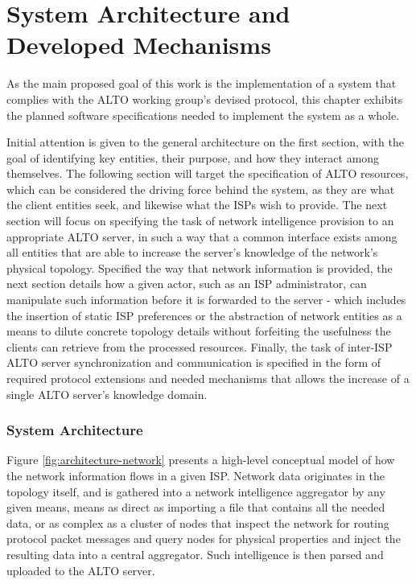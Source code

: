 \chapter{System Architecture and Developed Mechanisms}

As the main proposed goal of this work is the implementation of a system that complies with the ALTO working group's devised protocol, this chapter exhibits the planned software specifications needed to implement the system as a whole.

Initial attention is given to the general architecture on the first section, with the goal of identifying key entities, their purpose, and how they interact among themselves. The following section will target the specification of ALTO resources, which can be considered the driving force behind the system, as they are what the client entities seek, and likewise what the ISPs wish to provide. The next section will focus on specifying the task of network intelligence provision to an appropriate ALTO server, in such a way that a common interface exists among all entities that are able to increase the server's knowledge of the network's physical topology. Specified the way that network information is provided, the next section details how a given actor, such as an ISP administrator, can manipulate such information before it is forwarded to the server - which includes the insertion of static ISP preferences or the abstraction of network entities as a means to dilute concrete topology details without forfeiting the usefulness the clients can retrieve from the processed resources. Finally, the task of inter-ISP ALTO server synchronization and communication is specified in the form of required protocol extensions and needed mechanisms that allows the increase of a single ALTO server's knowledge domain.

\subsection{System Architecture}

Figure \ref{fig:architecture-network} presents a high-level conceptual model of how the network information flows in a given ISP. Network data originates in the topology itself, and is gathered into a network intelligence aggregator by any given means, means as direct as importing a file that contains all the needed data, or as complex as a cluster of nodes that inspect the network for routing protocol packet messages and query nodes for physical properties and inject the resulting data into a central aggregator. Such intelligence is then parsed and uploaded to the ALTO server.

